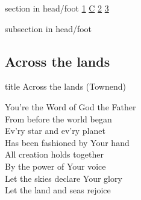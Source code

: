\documentclass{beamer}
\begin{document}
{
{ 
 {
 \begin{beamercolorbox}[ht=4.5ex,dp=1.5ex,%
      leftskip=.3cm,rightskip=.3cm plus1fil]{section in head/foot}
 \fontsize{12}{25}\selectfont 
\hyperlink{Across the lands["You're the Word of God the Father"](Townend)1}{1}
\hyperlink{Across the lands["You're the Word of God the Father"](Townend)C}{C}
\hyperlink{Across the lands["You're the Word of God the Father"](Townend)2}{2}
\hyperlink{Across the lands["You're the Word of God the Father"](Townend)3}{3}
 
 \end{beamercolorbox}%
  \begin{beamercolorbox}[ht=2.5ex,dp=1.125ex,%
   leftskip=.3cm,rightskip=.3cm plus1fil]{subsection in head/foot}
   \insertauthor
 \end{beamercolorbox}%
 }
}
\subsection{ Across the lands }

\hypertarget{Across the lands["You're the Word of God the Father"](Townend)}{}
\begin{frame}{}
 \vfill
  \centering
  \begin{beamercolorbox}[sep=8pt,center,shadow=true,rounded=true]{title}
    Across the lands (Townend)    
  \end{beamercolorbox}
  \vfill
\end{frame}

\hypertarget{Across the lands["You're the Word of God the Father"](Townend)1}{}
\begin{frame}{}
\fontsize{ 18 }{ 23 }\selectfont

You're the Word of God the Father\\ 
From before the world began\\ 
Ev'ry star and ev'ry planet\\ 
Has been fashioned by Your hand\\ 
All creation holds together\\ 
By the power of Your voice\\ 
Let the skies declare Your glory\\ 
Let the land and seas rejoice 

\end{frame}

\hypertarget{Across the lands["You're the Word of God the Father"](Townend)C}{}
\begin{frame}{}
\fontsize{ 18 }{ 23 }\selectfont


\end{frame}}
\end{document}
